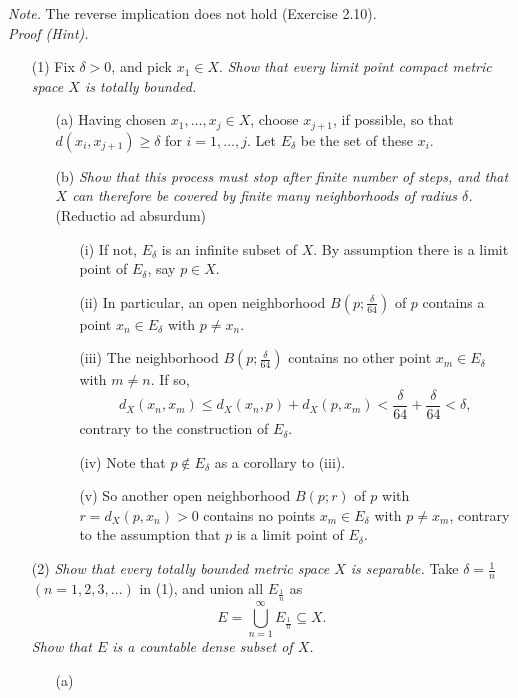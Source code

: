 \documentclass{article}
\begin{document}
\emph{Note.}
The reverse implication does not hold (Exercise 2.10). \\

\emph{Proof (Hint).}
\begin{enumerate}
\item[(1)]
Fix $\delta>0$, and pick $x_1 \in X$.
\emph{Show that every limit point compact metric space $X$ is totally bounded.}
  \begin{enumerate}
  \item[(a)]
  Having chosen $x_1, \ldots, x_j \in X$, choose $x_{j+1}$, if possible,
  so that $d(x_i,x_{j+1}) \geq \delta$ for $i=1,\ldots,j$.
  Let $E_\delta$ be the set of these $x_i$.
  \item[(b)]
  \emph{Show that this process must stop after finite number of steps,
  and that $X$ can therefore be covered by finite many neighborhoods of radius $\delta$.}
  (Reductio ad absurdum)
    \begin{enumerate}
    \item[(i)]
    If not, $E_\delta$ is an infinite subset of $X$.
    By assumption there is a limit point of $E_\delta$, say $p \in X$.
    \item[(ii)]
    In particular, an open neighborhood $B\left(p;\frac{\delta}{64}\right)$ of $p$
    contains a point $x_n \in E_\delta$ with $p \neq x_n$.
    \item[(iii)]
    The neighborhood $B\left(p;\frac{\delta}{64}\right)$ contains no other point
    $x_m \in E_\delta$ with $m \neq n$.
    If so,
    $$d_X(x_n,x_m) \leq d_X(x_n,p)+d_X(p,x_m)
    < \frac{\delta}{64} + \frac{\delta}{64} < \delta,$$
	contrary to the construction of $E_\delta$.
    \item[(iv)]
    Note that $p \not\in E_\delta$ as a corollary to (iii).
    \item[(v)]
    So another open neighborhood $B\left(p;r\right)$ of $p$ with $r = d_X(p,x_n) > 0$
    contains no points $x_m \in E_\delta$ with $p \neq x_m$,
    contrary to the assumption that $p$ is a limit point of $E_\delta$.
    \end{enumerate}
  \end{enumerate}
\item[(2)]
\emph{Show that every totally bounded metric space $X$ is separable.}
Take $\delta = \frac{1}{n}$ $(n=1,2,3,\ldots)$ in (1),
and union all $E_{\frac{1}{n}}$ as
$$E = \bigcup_{n=1}^{\infty} E_{\frac{1}{n}} \subseteq X.$$
\emph{Show that $E$ is a countable dense subset of $X$.}
  \begin{enumerate}
  \item[(a)]

\end{enumerate}
\end{enumerate}
\end{document}
